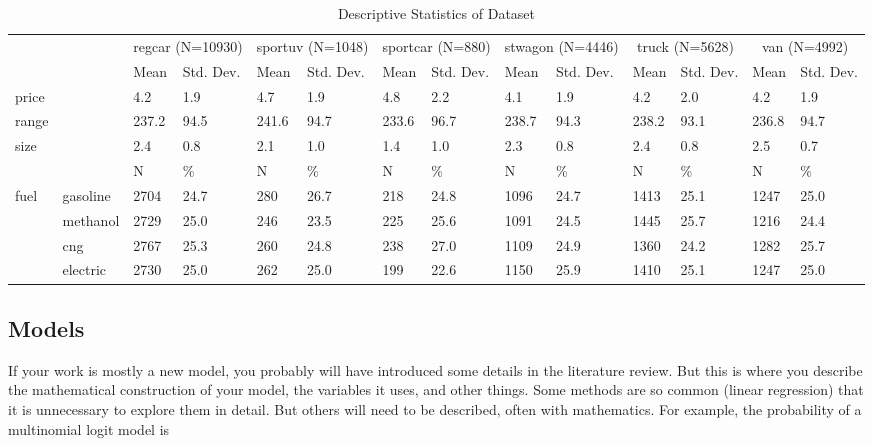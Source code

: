 \documentclass[3p, authoryear]{elsarticle} %
\begin{document}
\begin{table}

\caption{\label{tab:datasummary}Descriptive Statistics of Dataset}
\centering
\begin{tabular}[t]{llllllllllllll}
\toprule
\multicolumn{2}{c}{ } & \multicolumn{2}{c}{regcar (N=10930)} & \multicolumn{2}{c}{sportuv (N=1048)} & \multicolumn{2}{c}{sportcar (N=880)} & \multicolumn{2}{c}{stwagon (N=4446)} & \multicolumn{2}{c}{truck (N=5628)} & \multicolumn{2}{c}{van (N=4992)} \\
\cmidrule(l{3pt}r{3pt}){3-4} \cmidrule(l{3pt}r{3pt}){5-6} \cmidrule(l{3pt}r{3pt}){7-8} \cmidrule(l{3pt}r{3pt}){9-10} \cmidrule(l{3pt}r{3pt}){11-12} \cmidrule(l{3pt}r{3pt}){13-14}
  &    & Mean & Std. Dev. & Mean  & Std. Dev.  & Mean   & Std. Dev.   & Mean    & Std. Dev.    & Mean     & Std. Dev.     & Mean      & Std. Dev.     \\
\midrule
price &  & 4.2 & 1.9 & 4.7 & 1.9 & 4.8 & 2.2 & 4.1 & 1.9 & 4.2 & 2.0 & 4.2 & 1.9\\
range &  & 237.2 & 94.5 & 241.6 & 94.7 & 233.6 & 96.7 & 238.7 & 94.3 & 238.2 & 93.1 & 236.8 & 94.7\\
size &  & 2.4 & 0.8 & 2.1 & 1.0 & 1.4 & 1.0 & 2.3 & 0.8 & 2.4 & 0.8 & 2.5 & 0.7\\
\midrule
 &  & N & \% & N & \% & N & \% & N & \% & N & \% & N & \%\\
fuel & gasoline & 2704 & 24.7 & 280 & 26.7 & 218 & 24.8 & 1096 & 24.7 & 1413 & 25.1 & 1247 & 25.0\\
 & methanol & 2729 & 25.0 & 246 & 23.5 & 225 & 25.6 & 1091 & 24.5 & 1445 & 25.7 & 1216 & 24.4\\
 & cng & 2767 & 25.3 & 260 & 24.8 & 238 & 27.0 & 1109 & 24.9 & 1360 & 24.2 & 1282 & 25.7\\
 & electric & 2730 & 25.0 & 262 & 25.0 & 199 & 22.6 & 1150 & 25.9 & 1410 & 25.1 & 1247 & 25.0\\
\bottomrule
\end{tabular}
\end{table}

\hypertarget{models}{%
\subsection{Models}\label{models}}

If your work is mostly a new model, you probably will have introduced some
details in the literature review. But this is where you describe the
mathematical construction of your model, the variables it uses, and other
things. Some methods are so common (linear regression) that it is unnecessary to
explore them in detail. But others will need to be described, often with
mathematics. For example, the probability of a multinomial logit model is
\end{document}
